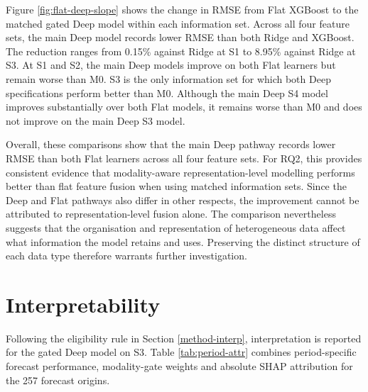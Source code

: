 \documentclass[
  british,
  12pt,
  oneside]{book}
\begin{document}
Figure \ref{fig:flat-deep-slope} shows the change in RMSE from Flat XGBoost to the matched gated Deep model within each information set. Across all four feature sets, the main Deep model records lower RMSE than both Ridge and XGBoost. The reduction ranges from 0.15\% against Ridge at S1 to 8.95\% against Ridge at S3. At S1 and S2, the main Deep models improve on both Flat learners but remain worse than M0. S3 is the only information set for which both Deep specifications perform better than M0. Although the main Deep S4 model improves substantially over both Flat models, it remains worse than M0 and does not improve on the main Deep S3 model.

Overall, these comparisons show that the main Deep pathway records lower RMSE than both Flat learners across all four feature sets. For RQ2, this provides consistent evidence that modality-aware representation-level modelling performs better than flat feature fusion when using matched information sets. Since the Deep and Flat pathways also differ in other respects, the improvement cannot be attributed to representation-level fusion alone. The comparison nevertheless suggests that the organisation and representation of heterogeneous data affect what information the model retains and uses. Preserving the distinct structure of each data type therefore warrants further investigation.

\section{Interpretability}\label{results-interp}

Following the eligibility rule in Section \ref{method-interp}, interpretation is reported for the gated Deep model on S3. Table \ref{tab:period-attr} combines period-specific forecast performance, modality-gate weights and absolute SHAP attribution for the 257 forecast origins.
\end{document}

